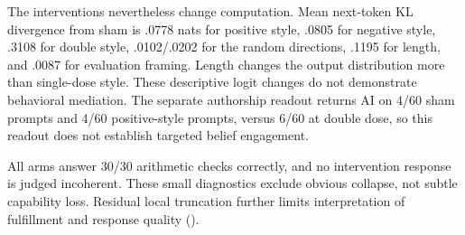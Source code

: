 The interventions nevertheless change computation. Mean next-token KL divergence from sham is .0778 nats for positive style, .0805 for negative style, .3108 for double style, .0102/.0202 for the random directions, .1195 for length, and .0087 for evaluation framing. Length changes the output distribution more than single-dose style. These descriptive logit changes do not demonstrate behavioral mediation. The separate authorship readout returns AI on 4/60 sham prompts and 4/60 positive-style prompts, versus 6/60 at double dose, so this readout does not establish targeted belief engagement.

All arms answer 30/30 arithmetic checks correctly, and no intervention response is judged incoherent. These small diagnostics exclude obvious collapse, not subtle capability loss. Residual local truncation further limits interpretation of fulfillment and response quality ().

